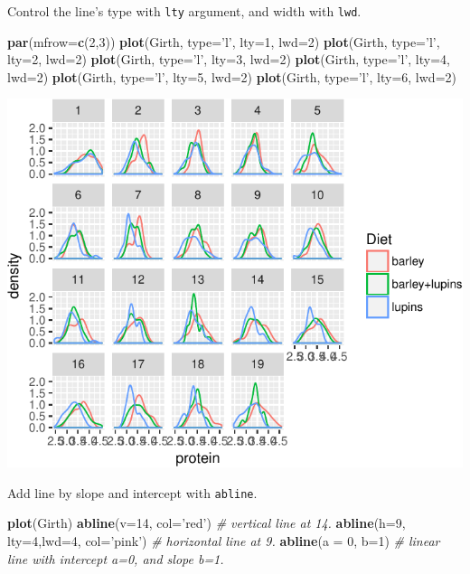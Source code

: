 \documentclass[]{book}
\newenvironment{Shaded}{\begin{snugshade}}{\end{snugshade}}
\newcommand{\KeywordTok}[1]{\textcolor[rgb]{0.13,0.29,0.53}{\textbf{#1}}}
\newcommand{\DataTypeTok}[1]{\textcolor[rgb]{0.13,0.29,0.53}{#1}}
\newcommand{\DecValTok}[1]{\textcolor[rgb]{0.00,0.00,0.81}{#1}}
\newcommand{\StringTok}[1]{\textcolor[rgb]{0.31,0.60,0.02}{#1}}
\newcommand{\CommentTok}[1]{\textcolor[rgb]{0.56,0.35,0.01}{\textit{#1}}}
\newcommand{\NormalTok}[1]{#1}
\theoremstyle{definition}
\theoremstyle{definition}
\theoremstyle{definition}
\theoremstyle{remark}
\begin{document}
Control the line's type with \texttt{lty} argument, and width with
\texttt{lwd}.

\begin{Shaded}
\begin{Highlighting}[]
\KeywordTok{par}\NormalTok{(}\DataTypeTok{mfrow=}\KeywordTok{c}\NormalTok{(}\DecValTok{2}\NormalTok{,}\DecValTok{3}\NormalTok{))}
\KeywordTok{plot}\NormalTok{(Girth, }\DataTypeTok{type=}\StringTok{'l'}\NormalTok{, }\DataTypeTok{lty=}\DecValTok{1}\NormalTok{, }\DataTypeTok{lwd=}\DecValTok{2}\NormalTok{)}
\KeywordTok{plot}\NormalTok{(Girth, }\DataTypeTok{type=}\StringTok{'l'}\NormalTok{, }\DataTypeTok{lty=}\DecValTok{2}\NormalTok{, }\DataTypeTok{lwd=}\DecValTok{2}\NormalTok{)}
\KeywordTok{plot}\NormalTok{(Girth, }\DataTypeTok{type=}\StringTok{'l'}\NormalTok{, }\DataTypeTok{lty=}\DecValTok{3}\NormalTok{, }\DataTypeTok{lwd=}\DecValTok{2}\NormalTok{)}
\KeywordTok{plot}\NormalTok{(Girth, }\DataTypeTok{type=}\StringTok{'l'}\NormalTok{, }\DataTypeTok{lty=}\DecValTok{4}\NormalTok{, }\DataTypeTok{lwd=}\DecValTok{2}\NormalTok{)}
\KeywordTok{plot}\NormalTok{(Girth, }\DataTypeTok{type=}\StringTok{'l'}\NormalTok{, }\DataTypeTok{lty=}\DecValTok{5}\NormalTok{, }\DataTypeTok{lwd=}\DecValTok{2}\NormalTok{)}
\KeywordTok{plot}\NormalTok{(Girth, }\DataTypeTok{type=}\StringTok{'l'}\NormalTok{, }\DataTypeTok{lty=}\DecValTok{6}\NormalTok{, }\DataTypeTok{lwd=}\DecValTok{2}\NormalTok{)}
\end{Highlighting}
\end{Shaded}

\includegraphics[width=0.5\linewidth]{Rcourse_files/figure-latex/unnamed-chunk-245-1}

Add line by slope and intercept with \texttt{abline}.

\begin{Shaded}
\begin{Highlighting}[]
\KeywordTok{plot}\NormalTok{(Girth)}
\KeywordTok{abline}\NormalTok{(}\DataTypeTok{v=}\DecValTok{14}\NormalTok{, }\DataTypeTok{col=}\StringTok{'red'}\NormalTok{) }\CommentTok{# vertical line at 14.}
\KeywordTok{abline}\NormalTok{(}\DataTypeTok{h=}\DecValTok{9}\NormalTok{, }\DataTypeTok{lty=}\DecValTok{4}\NormalTok{,}\DataTypeTok{lwd=}\DecValTok{4}\NormalTok{, }\DataTypeTok{col=}\StringTok{'pink'}\NormalTok{) }\CommentTok{# horizontal line at 9.}
\KeywordTok{abline}\NormalTok{(}\DataTypeTok{a =} \DecValTok{0}\NormalTok{, }\DataTypeTok{b=}\DecValTok{1}\NormalTok{) }\CommentTok{# linear line with intercept a=0, and slope b=1.}
\end{Highlighting}
\end{Shaded}
\end{document}
